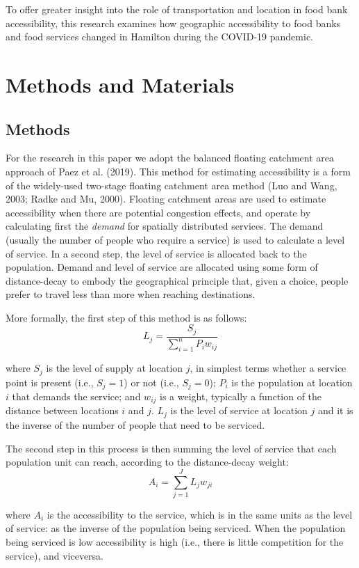 \documentclass[]{elsarticle} %
\begin{document}
To offer greater insight into the role of transportation and location in
food bank accessibility, this research examines how geographic
accessibility to food banks and food services changed in Hamilton during
the COVID-19 pandemic.

\hypertarget{methods-and-materials}{%
\section{Methods and Materials}\label{methods-and-materials}}

\hypertarget{methods}{%
\subsection{Methods}\label{methods}}

For the research in this paper we adopt the balanced floating catchment
area approach of Paez et al. (2019). This method for estimating
accessibility is a form of the widely-used two-stage floating catchment
area method (Luo and Wang, 2003; Radke and Mu, 2000). Floating catchment
areas are used to estimate accessibility when there are potential
congestion effects, and operate by calculating first the \emph{demand}
for spatially distributed services. The demand (usually the number of
people who require a service) is used to calculate a level of service.
In a second step, the level of service is allocated back to the
population. Demand and level of service are allocated using some form of
distance-decay to embody the geographical principle that, given a
choice, people prefer to travel less than more when reaching
destinations.

More formally, the first step of this method is as follows: \[
L_j = \frac{S_j}{\sum_{i=1}^nP_iw_{ij}}
\]

\noindent where \(S_j\) is the level of supply at location \(j\), in
simplest terms whether a service point is present (i.e., \(S_j=1\)) or
not (i.e., \(S_j=0\)); \(P_i\) is the population at location \(i\) that
demands the service; and \(w_{ij}\) is a weight, typically a function of
the distance between locations \(i\) and \(j\). \(L_j\) is the level of
service at location \(j\) and it is the inverse of the number of people
that need to be serviced.

The second step in this process is then summing the level of service
that each population unit can reach, according to the distance-decay
weight: \[
A_i = \sum_{j=1}^JL_jw_{ji}
\]

\noindent where \(A_i\) is the accessibility to the service, which is in
the same units as the level of service: as the inverse of the population
being serviced. When the population being serviced is low accessibility
is high (i.e., there is little competition for the service), and
viceversa.
\end{document}
